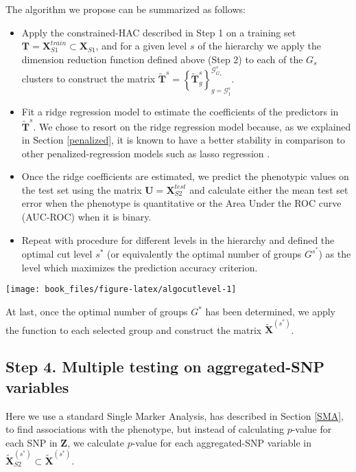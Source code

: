 \documentclass[]{book}
\begin{document}
The algorithm we propose can be summarized as follows:

\begin{itemize}
\item
  Apply the constrained-HAC described in Step 1 on a training set
  \(\mathbf{T} = \mathbf{X}^{train}_{S1} \subset \mathbf{X}_{S1}\), and for a given level \(s\)
  of the hierarchy we apply the dimension reduction function defined
  above (Step 2) to each of the \(G_s\) clusters to construct the matrix
  \(\tilde{\mathbf{T}}^s = \left\lbrace \tilde{\mathbf{T}}_g^s \right\rbrace_{g = \mathcal{G}^s_1}^{\mathcal{G}^s_{G_s}}\).
\item
  Fit a ridge regression model to estimate the coefficients of the
  predictors in \(\tilde{\mathbf{T}}^s\). We chose to resort on the ridge
  regression model because, as we explained in Section
  \ref{penalized}, it is known to have a better stability in
  comparison to other penalized-regression models such as lasso
  regression \citep{bousquet_stability_2002}.
\item
  Once the ridge coefficients are estimated, we predict the phenotypic
  values on the test set using the matrix \(\mathbf{U} = \mathbf{X}^{test}_{S2}\) and
  calculate either the mean test set error when the phenotype is
  quantitative or the Area Under the ROC curve (AUC-ROC) when it is
  binary.
\item
  Repeat with procedure for different levels in the hierarchy and
  defined the optimal cut level \(s^*\) (or equivalently the optimal
  number of groups \(G^{s^*}\)) as the level which maximizes the
  prediction accuracy criterion.
\end{itemize}

\begin{center}\texttt{[image: book\_files/figure-latex/algocutlevel-1]} \end{center}

At last, once the optimal number of groups \(G^*\) has been determined, we
apply the function to each selected group and construct the matrix
\(\tilde{\mathbf{X}}^{(s^*)}\).

\hypertarget{step4}{%
\subsection{Step 4. Multiple testing on aggregated-SNP variables}\label{step4}}

Here we use a standard Single Marker Analysis, has described in Section
\ref{SMA}, to find associations with the phenotype, but instead of
calculating \(p\)-value for each SNP in \(\mathbf{Z}\), we calculate \(p\)-value for
each aggregated-SNP variable in \(\tilde{\mathbf{X}}^{(s^*)}_{S2} \subset \tilde{\mathbf{X}}^{(s^*)}\).
\end{document}

